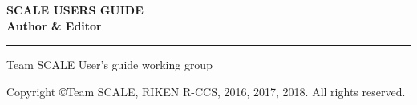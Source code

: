 \newpage
\thispagestyle{empty}

\vspace{10mm}
{\large{\bf SCALE USERS GUIDE}}\\


\vspace{10mm}
{\large{\bf Author \& Editor}}\\
\hrule width 90mm
\begin{tabbing}
Team SCALE User's guide working group\\
\end{tabbing}


\vspace{110mm}
\begin{flushright}

\vspace{10mm}
Copyright \copyright Team SCALE, RIKEN R-CCS, 2016, 2017, 2018. All rights reserved.
\end{flushright}

